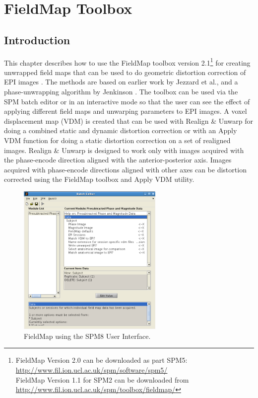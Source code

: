 \chapter{FieldMap Toolbox \label{Chap:FieldMap}}

\section{Introduction}

This chapter describes how to use the FieldMap toolbox version 2.1\footnote{
FieldMap Version 2.0 can be downloaded as part SPM5:
\url{http://www.fil.ion.ucl.ac.uk/spm/software/spm5/}\\
FieldMap Version 1.1 for SPM2 can be downloaded from
\url{http://www.fil.ion.ucl.ac.uk/spm/toolbox/fieldmap/}}
 for creating unwrapped field maps that can be used to do geometric distortion correction of EPI images \cite{chloe_distortion,chloe_distortion2,ja_geometric}. The methods are based on earlier work by Jezzard et al.,\cite{jezzard95} and a phase-unwrapping algorithm by Jenkinson \cite{jenkinson03}. The toolbox can be used via the SPM batch editor or in an interactive mode so that the user can see the effect of applying different field maps and unwarping parameters to EPI images. A voxel displacement map (VDM) is created that can be used with Realign \& Unwarp for doing a combined static and dynamic distortion correction or with an Apply VDM function for doing a static distortion correction on a set of realigned images. Realign \& Unwarp is designed to work only with images acquired with the phase-encode direction aligned with the anterior-posterior axis. Images acquired with phase-encode directions aligned with other axes can be distortion corrected using the FieldMap toolbox and Apply VDM utility.

\begin{figure}
\begin{center}
\includegraphics[width=70mm]{FieldMap/fieldmap_taskmgr}
\end{center}
\caption{FieldMap using the SPM8 User Interface.\label{FM1}}
\end{figure}

